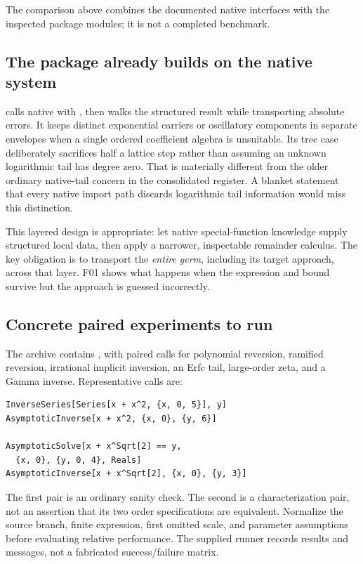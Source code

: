 The comparison above combines the documented native interfaces with the inspected package modules; it is not a completed benchmark.\cite{wl-asymptotic,wl-asolve,wl-inverse,wl-seriesdata,wl-productlog,wl-interval,wl-integrate,wl-sum,readme,flat,fourier,native,cert,status}

\subsection{The package already builds on the native system}

 calls native  with , then walks the structured result while transporting absolute errors. It keeps distinct exponential carriers or oscillatory components in separate envelopes when a single ordered coefficient algebra is unsuitable. Its  tree case deliberately sacrifices half a lattice step rather than assuming an unknown logarithmic tail has degree zero. That is materially different from the older ordinary native-tail concern in the consolidated register. A blanket statement that every native import path discards logarithmic tail information would miss this distinction.\cite{native,status,wl-series}

This layered design is appropriate: let native special-function knowledge supply structured local data, then apply a narrower, inspectable remainder calculus. The key obligation is to transport the \emph{entire germ}, including its target approach, across that layer. F01 shows what happens when the expression and bound survive but the approach is guessed incorrectly.

\subsection{Concrete paired experiments to run}

The archive contains , with paired calls for polynomial reversion, ramified reversion, irrational implicit inversion, an Erfc tail, large-order zeta, and a Gamma inverse. Representative calls are:
\begin{lstlisting}
InverseSeries[Series[x + x^2, {x, 0, 5}], y]
AsymptoticInverse[x + x^2, {x, 0}, {y, 6}]

AsymptoticSolve[x + x^Sqrt[2] == y,
  {x, 0}, {y, 0, 4}, Reals]
AsymptoticInverse[x + x^Sqrt[2], {x, 0}, {y, 3}]
\end{lstlisting}
The first pair is an ordinary sanity check. The second is a characterization pair, not an assertion that its two order specifications are equivalent. Normalize the source branch, finite expression, first omitted scale, and parameter assumptions before evaluating relative performance. The supplied runner records results and messages, not a fabricated success/failure matrix.

